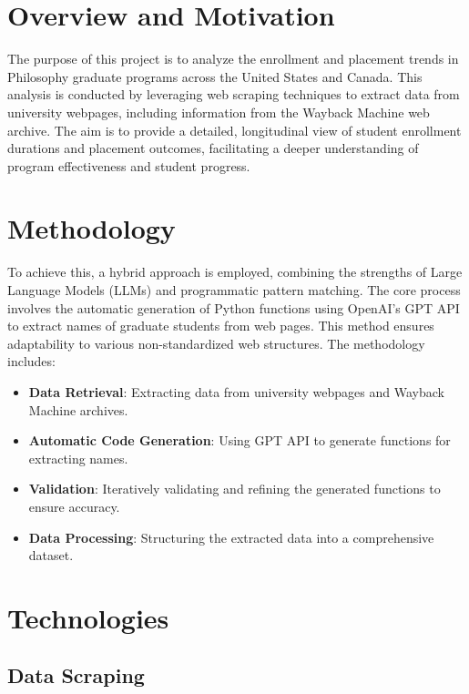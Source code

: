 \documentclass[11pt]{article}
\begin{document}
\section{Overview and Motivation}

The purpose of this project is to analyze the enrollment and placement trends in Philosophy graduate programs across the United States and Canada.
This analysis is conducted by leveraging web scraping techniques to extract data from university webpages, including information from the Wayback Machine web archive.
The aim is to provide a detailed, longitudinal view of student enrollment durations and placement outcomes, facilitating a deeper understanding of program effectiveness and student progress.

\section{Methodology}

To achieve this, a hybrid approach is employed, combining the strengths of Large Language Models (LLMs) and programmatic pattern matching.
The core process involves the automatic generation of Python functions using OpenAI's GPT API to extract names of graduate students from web pages.
This method ensures adaptability to various non-standardized web structures.
The methodology includes:

\begin{itemize}
\item \textbf{Data Retrieval}: Extracting data from university webpages and Wayback Machine archives.
\item \textbf{Automatic Code Generation}: Using GPT API to generate functions for extracting names.
\item \textbf{Validation}: Iteratively validating and refining the generated functions to ensure accuracy.
\item \textbf{Data Processing}: Structuring the extracted data into a comprehensive dataset.
\end{itemize}

\section{Technologies}

\subsection{Data Scraping}
\end{document}
